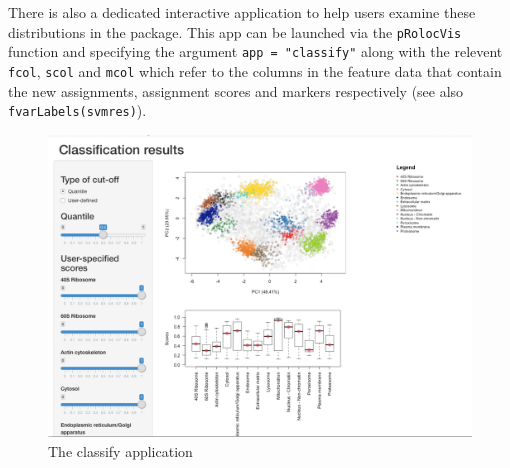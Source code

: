 There is also a dedicated interactive application to help users
examine these distributions in the  package.
This app can be launched via the \texttt{pRolocVis} function and specifying
the argument \texttt{app = "classify"} along with the relevent \texttt{fcol}, \texttt{scol}
and \texttt{mcol} which refer to the columns in the feature data that contain
the new assignments, assignment scores and markers respectively (see
also \texttt{fvarLabels(svmres)}).

\begin{knitrout}
\color{fgcolor}\begin{kframe}
\begin{alltt}
\hlstd{(}\hlstd{)}
           \hlstd{=} \hlstd{,}
           \hlstd{=} \hlstd{,}
                 \hlstd{=} \hlstd{,}
           \hlstd{=} \hlstd{)}
\end{alltt}
\end{kframe}
\end{knitrout}

\begin{figure}[!ht]
  \centering
  \includegraphics[width=\textwidth]{./Figures/classify.png}
  \caption{The classify application}
  \label{fig:classifyapp}
\end{figure}


